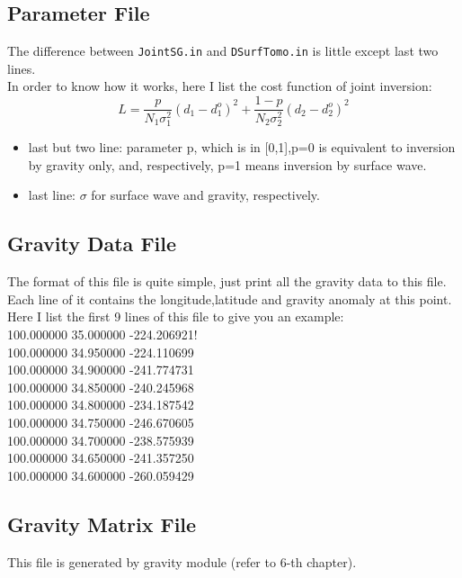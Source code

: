 \documentclass[UTF8]{article}
\begin{document}
    \subsection{Parameter File}
    The difference between \verb!JointSG.in! and \verb!DSurfTomo.in! is little except
    last two lines.\\


    In order to know how it works, here I list the cost function of joint inversion:
    \[
        L = \frac{p}{N_1 \sigma_1^2} (d_1- d_1^o)^2 + 
            \frac{1-p}{N_2 \sigma_2^2} (d_2- d_2^o)^2 \tag{1}
    \]
    \begin{itemize}
        \item last but two line: parameter p, which is in [0,1],p=0 is equivalent to 
                                inversion by gravity only, and, respectively, p=1 means 
                                inversion by surface wave.
        \item last line: $\sigma$ for surface wave and gravity, respectively.
    \end{itemize}

    \subsection{Gravity Data File}
    The format of this file is quite simple, just print all the gravity data to this file.
    Each line of it contains the longitude,latitude and gravity anomaly at this point. \\

    Here I list the first 9 lines of this file to give you an example:\\
    100.000000 35.000000 -224.206921!\\
    100.000000 34.950000 -224.110699\\
    100.000000 34.900000 -241.774731\\
    100.000000 34.850000 -240.245968\\
    100.000000 34.800000 -234.187542\\
    100.000000 34.750000 -246.670605\\
    100.000000 34.700000 -238.575939\\
    100.000000 34.650000 -241.357250\\
    100.000000 34.600000 -260.059429\\

    \subsection{Gravity Matrix File}
    This file is generated by gravity module (refer to 6-th chapter).
\end{document}
